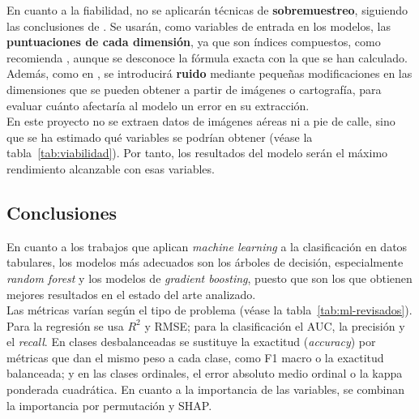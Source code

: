 En cuanto a la fiabilidad, no se aplicarán técnicas de \textbf{sobremuestreo}, siguiendo las conclusiones de \textcite{wang2026}. Se usarán, como variables de entrada en los modelos, las \textbf{puntuaciones de cada dimensión}, ya que son índices compuestos, como recomienda \textcite{agal2026}, aunque se desconoce la fórmula exacta con la que se han calculado.
\\

Además, como en \textcite{knights2026}, se introducirá \textbf{ruido} mediante pequeñas modificaciones en las dimensiones que se pueden obtener a partir de imágenes o cartografía, para evaluar cuánto afectaría al modelo un error en su extracción.
\\

En este proyecto no se extraen datos de imágenes aéreas ni a pie de calle, sino que se ha estimado qué variables se podrían obtener (véase la tabla~\ref{tab:viabilidad}). Por tanto, los resultados del modelo serán el máximo rendimiento alcanzable con esas variables.
\\

\subsection{Conclusiones}
\label{subsec:ml-conclusiones}

En cuanto a los trabajos que aplican \textit{machine learning} a la clasificación en datos tabulares, los modelos más adecuados son los árboles de decisión, especialmente \textit{random forest} y los modelos de \textit{gradient boosting}, puesto que son los que obtienen mejores resultados en el estado del arte analizado.
\\

Las métricas varían según el tipo de problema (véase la tabla~\ref{tab:ml-revisados}). Para la regresión se usa $R^2$ y \gls{RMSE}; para la clasificación el AUC, la precisión y el \textit{recall}. En clases desbalanceadas se sustituye la exactitud (\textit{accuracy}) por métricas que dan el mismo peso a cada clase, como F1 macro o la exactitud balanceada; y en las clases ordinales, el error absoluto medio ordinal o la kappa ponderada cuadrática. En cuanto a la importancia de las variables, se combinan la importancia por permutación y SHAP.
\\

